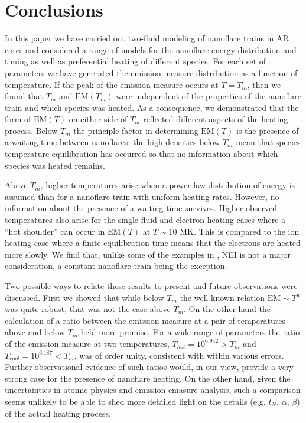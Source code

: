 \documentclass[preprint]{aastex}
\begin{document}
	\section{Conclusions}
	\label{sec:conclusions}
	\par In this paper we have carried out two-fluid modeling of nanoflare trains in AR cores and considered a range of models for the nanoflare energy distribution and timing as well as preferential heating of different species. For each set of parameters we have generated the emission measure distribution as a function of temperature. If the peak of the emission measure occurs at $T = T_m$, then we found that $T_m$ and $\mathrm{EM}(T_m)$ were independent of the properties of the nanoflare train and which species was heated. As a consequence, we demonstrated that the form of $\mathrm{EM}(T)$ on either side of $T_m$ reflected different aspects of the heating process. Below $T_m$ the principle factor in determining $\mathrm{EM}(T)$ is the presence of a waiting time between nanoflares: the high densities below $T_m$ mean that species temperature equilibration has occurred so that no information about which species was heated remains.
	\par Above $T_m$, higher temperatures arise when a power-law distribution of energy is assumed than for a nanoflare train with uniform heating rates. However, no information about the presence of a waiting time survives. Higher observed temperatures also arise for the single-fluid and electron heating cases where a ``hot shoulder'' can occur in $\mathrm{EM}(T)$ at $T\sim10$ MK. This is compared to the ion heating case where a finite equilibration time means that the electrons are heated more slowly. We find that, unlike some of the examples in , NEI is not a major consideration, a constant nanoflare train being the exception.
	\par Two possible ways to relate these results to present and future observations were discussed. First we showed that while below $T_m$ the well-known relation $\mathrm{EM}\sim T^a$ was quite robust, that was not the case above $T_m$. On the other hand the calculation of a ratio between the emission measure at a pair of temperatures above and below $T_m$ held more promise. For a wide range of parameters the ratio of the emission measure at two temperatures, $T_{hot}=10^{6.942}>T_m$ and $T_{cool}=10^{6.187}<T_m$, was of order unity, consistent with \citet{brosius_pervasive_2014} within various errors. Further observational evidence of such ratios would, in our view, provide a very strong case for the presence of nanoflare heating. On the other hand, given the uncertainties in atomic physics and emission emasure analysis, such a comparison seems unlikely to be able to shed more detailed light on the details (e.g. $t_N$, $\alpha$, $\beta$) of the actual heating process.
\end{document}
